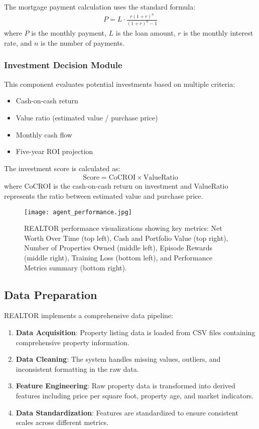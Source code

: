 \documentclass[conference]{IEEEtran}
\begin{document}
The mortgage payment calculation uses the standard formula:
\begin{align}
P = L \cdot \frac{r(1+r)^n}{(1+r)^n-1}
\end{align}
where $P$ is the monthly payment, $L$ is the loan amount, $r$ is the monthly interest rate, and $n$ is the number of payments.

\subsubsection{Investment Decision Module}
This component evaluates potential investments based on multiple criteria:
\begin{itemize}
\item Cash-on-cash return
\item Value ratio (estimated value / purchase price)
\item Monthly cash flow
\item Five-year ROI projection
\end{itemize}

The investment score is calculated as:
\begin{align}
\text{Score} = \text{CoCROI} \times \text{ValueRatio}
\end{align}
where CoCROI is the cash-on-cash return on investment and ValueRatio represents the ratio between estimated value and purchase price.

\begin{figure}[htbp]
\centerline{\texttt{[image: agent\_performance.jpg]}}
\caption{REALTOR performance visualizations showing key metrics: Net Worth Over Time (top left), Cash and Portfolio Value (top right), Number of Properties Owned (middle left), Episode Rewards (middle right), Training Loss (bottom left), and Performance Metrics summary (bottom right).}
\label{fig_architecture}
\end{figure}

\subsection{Data Preparation}
REALTOR implements a comprehensive data pipeline:

\begin{enumerate}
\item \textbf{Data Acquisition}: Property listing data is loaded from CSV files containing comprehensive property information.
\item \textbf{Data Cleaning}: The system handles missing values, outliers, and inconsistent formatting in the raw data.
\item \textbf{Feature Engineering}: Raw property data is transformed into derived features including price per square foot, property age, and market indicators.
\item \textbf{Data Standardization}: Features are standardized to ensure consistent scales across different metrics.
\end{enumerate}
\end{document}
